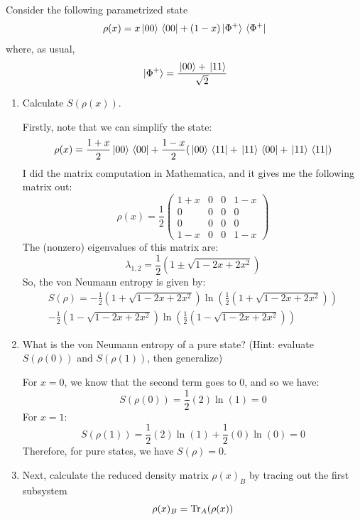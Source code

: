 \documentclass[10pt]{article}
\begin{document}
	 Consider the following parametrized state
	 \[
	 \rho(x) = x \ket*{00}\bra*{00} + (1-x) \ket*{\Phi^{+}} \bra*{\Phi^{+}}
	 \] 
	 where, as usual, 
	 \[
	 \ket*{\Phi^{+}} = \frac{\ket*{00} + \ket*{11}}{\sqrt{2} }
	 \] 
	 \begin{enumerate}[label=\alph*)]
	 	\item Calculate \( S(\rho(x)) \). 

			\begin{solution}
				Firstly, note that we can simplify the state:
				\[
					\rho(x) = \frac{1 + x}{2}\ket*{00}\bra*{00} + \frac{1-x}{2}(\ket*{00}\bra*{11} + \ket*{11}\bra*{00}
					+ \ket*{11}\bra*{11})
				\] 
				I did the matrix computation in Mathematica, and it gives me the following matrix out:
				\[
					\rho(x) = \frac{1}{2}\begin{pmatrix} 1+x&0&0&1-x\\0&0&0&0\\0&0&0&0\\1-x&0&0&1-x \end{pmatrix} 
				\] 
				The (nonzero) eigenvalues of this matrix are:
				\[
				\lambda_{1, 2} = \frac{1}{2}(1 \pm \sqrt{1 - 2x + 2x^2})
				\] 
				So, the von Neumann entropy is given by:
				\begin{multline*}
				S(\rho) = -\frac{1}{2}(1 + \sqrt{1 - 2x + 2x^2})
				\ln\left( \frac{1}{2}(1 + \sqrt{1 - 2x + 2x^2})	\right) \\
			-\frac{1}{2}(1 - \sqrt{1 - 2x + 2x^2})  \ln\left( \frac{1}{2}(1 - \sqrt{1 - 2x + 2x^2})  \right) 
			\end{multline*} 
			\end{solution}
		\item What is the von Neumann entropy of a pure state? (Hint: evaluate \( S(\rho(0)) \) and \( 
			S(\rho(1))\), then generalize)

			\begin{solution}
				For \( x = 0 \), we know that the second term goes to 0, and so we have:
				\[
				S(\rho(0)) = \frac{1}{2}(2)\ln (1) = 0
				\] 
				For \( x = 1 \):
				\[
				S(\rho(1)) = \frac{1}{2}(2)\ln(1) + \frac{1}{2}(0) \ln (0) = 0
				\] 
				Therefore, for pure states, we have \( S(\rho) = 0 \).
			\end{solution}
		\item Next, calculate the reduced density matrix \( \rho(x)_B \) by tracing out the first subsystem
			\[
			\rho(x)_B = \Tr_A(\rho(x))
			\]


\end{enumerate}
\end{document}
